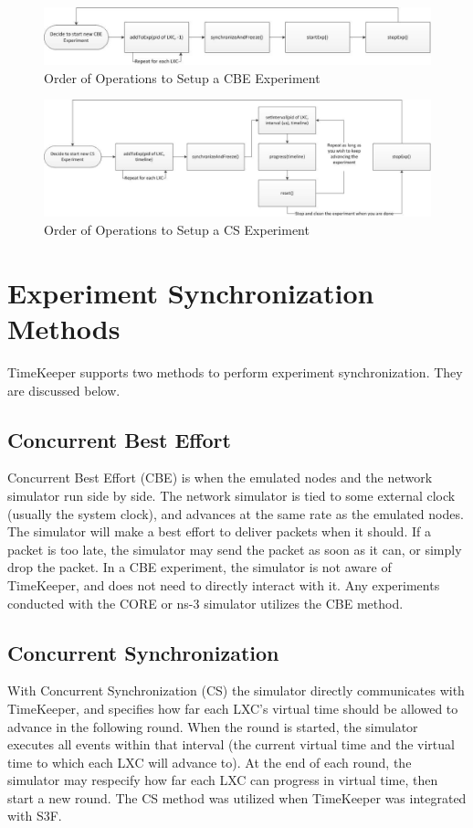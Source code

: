 \begin{figure}[t] 
      \includegraphics[width=\textwidth]{images/cbe_functions.eps} 
    \caption{Order of Operations to Setup a CBE Experiment } 
    \label{fig:cbe_functions} 
  \end{figure} 
\begin{figure}[t] 
      \includegraphics[width=\textwidth]{images/cs_functions.eps} 
    \caption{Order of Operations to Setup a CS Experiment } 
    \label{fig:cs_functions} 
  \end{figure} 
\section{Experiment Synchronization Methods}
TimeKeeper supports two methods to perform experiment synchronization. They are discussed below.
\subsection{Concurrent Best Effort}
Concurrent Best Effort (CBE) is when the emulated nodes and the network simulator run side by side. The network simulator is tied to some external clock (usually the system clock), and advances at the same rate as the emulated nodes. The simulator will make a best effort to deliver packets when it should. If a packet is too late, the simulator may send the packet as soon as it can, or simply drop the packet. In a CBE experiment, the simulator is not aware of TimeKeeper, and does not need to directly interact with it. Any experiments conducted with the CORE or ns-3 simulator utilizes the CBE method.
\subsection{Concurrent Synchronization}
With Concurrent Synchronization (CS) the simulator directly communicates with TimeKeeper, and specifies how far each LXC's virtual time should be allowed to advance in the following round. When the round is started, the simulator executes all events within that interval (the current virtual time and the virtual time to which each LXC will advance to). At the end of each round, the simulator may respecify how far each LXC can progress in virtual time, then start a new round. The CS method was utilized when TimeKeeper was integrated with S3F.

